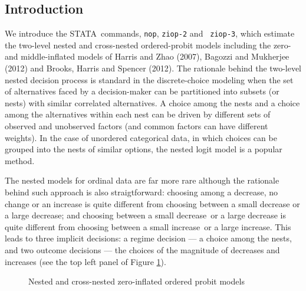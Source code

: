 \documentclass[letterpaper,fleqn,12pt]{article}
\begin{document}
\begin{onehalfspace}%

\section{Introduction}

We introduce the STATA\ commands, \texttt{nop}, \texttt{ziop-2} and \texttt{%
ziop-3}, which estimate the two-level nested and cross-nested ordered-probit
models including the zero- and middle-inflated models of Harris and Zhao
(2007), Bagozzi and Mukherjee (2012) and Brooks, Harris and Spencer (2012).
The rationale behind the two-level nested decision process is standard in
the discrete-choice modeling when the set of alternatives faced by a
decision-maker can be partitioned into subsets (or nests) with similar
correlated alternatives. A choice among the nests and a choice among the
alternatives within each nest can be driven by different sets of observed
and unobserved factors (and common factors can have different weights). In
the case of unordered categorical data, in which choices can be grouped into
the nests of similar options, the nested logit model is a popular method.

The nested models for ordinal data are far more rare although the rationale
behind such approach is also straigtforward: choosing among a decrease, no
change or an increase is quite different from choosing between a small
decrease or a large decrease; and choosing between a small decrease\ or a
large decrease is quite different from choosing between a small increase\ or
a large increase. This leads to three implicit decisions: a regime decision
--- a choice among the nests, and two outcome decisions --- the choices of
the magnitude of decreases and increases (see the top left panel of Figure %
\ref{trees}).

\medskip 

\begin{figure}[H] \captionsetup{singlelinecheck = false, justification=justified}%
\caption{Nested and cross-nested zero-inflated ordered probit
models\label{trees}}%
\centering%


\end{figure}
\end{onehalfspace}
\end{document}
